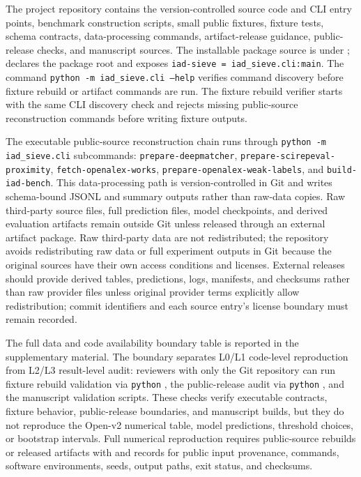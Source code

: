 \documentclass[preprint,12pt]{elsarticle}
\begin{document}
\begin{sloppypar}

The project repository contains the version-controlled source code and CLI entry points, benchmark construction scripts, small public fixtures, fixture tests, schema contracts, data-processing commands, artifact-release guidance, public-release checks, and manuscript sources. The installable package source is under ;  declares the package root and exposes \texttt{iad-sieve = iad\_sieve.cli:main}. The command \texttt{python -m iad\_sieve.cli --help} verifies command discovery before fixture rebuild or artifact commands are run. The fixture rebuild verifier starts with the same CLI discovery check and rejects missing public-source reconstruction commands before writing fixture outputs.

The executable public-source reconstruction chain runs through \texttt{python -m iad\_sieve.cli} subcommands: \texttt{prepare-deepmatcher}, \texttt{prepare-scirepeval-proximity}, \texttt{fetch-openalex-works}, \texttt{prepare-openalex-weak-labels}, and \texttt{build-iad-bench}. This data-processing path is version-controlled in Git and writes schema-bound JSONL and summary outputs rather than raw-data copies. Raw third-party source files, full prediction files, model checkpoints, and derived evaluation artifacts remain outside Git unless released through an external artifact package. Raw third-party data are not redistributed; the repository avoids redistributing raw data or full experiment outputs in Git because the original sources have their own access conditions and licenses. External releases should provide derived tables, predictions, logs, manifests, and checksums rather than raw provider files unless original provider terms explicitly allow redistribution; commit identifiers and each source entry's license boundary must remain recorded.

The full data and code availability boundary table is reported in the supplementary material. The boundary separates L0/L1 code-level reproduction from L2/L3 result-level audit: reviewers with only the Git repository can run fixture rebuild validation via \texttt{python} , the public-release audit via \texttt{python} , and the manuscript validation scripts. These checks verify executable contracts, fixture behavior, public-release boundaries, and manuscript builds, but they do not reproduce the Open-v2 numerical table, model predictions, threshold choices, or bootstrap intervals. Full numerical reproduction requires public-source rebuilds or released artifacts with  and  records for public input provenance, commands, software environments, seeds, output paths, exit status, and checksums.


\end{sloppypar}
\end{document}
